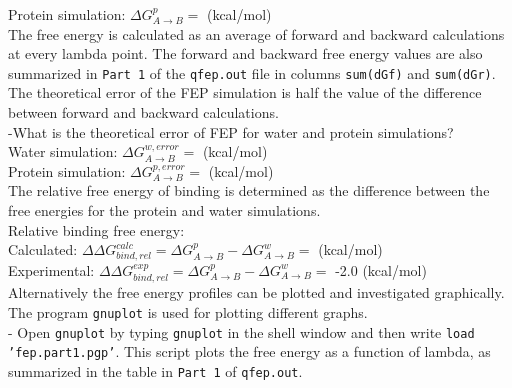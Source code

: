 \documentclass[10pt,oneside,pdftex]{article}
\begin{document}
Protein simulation: $\Delta G_{A \rightarrow B}^p=$ \hspace{2cm}(kcal/mol)\\

The free  energy is calculated as  an average of forward  and backward
calculations  at every  lambda point.  The forward  and backward  free
energy  values  are also  summarized  in  \texttt{Part   1}  of  the
\texttt{qfep.out}    file    in    columns    \texttt{sum(dGf)}    and
\texttt{sum(dGr)}. The theoretical error of the FEP simulation is half
the   value   of  the   difference   between   forward  and   backward
calculations.\\

-What is the theoretical error of FEP for water and protein simulations?\\

Water simulation: $\Delta G_{A \rightarrow B}^{w,error}=$ \hspace{2cm} (kcal/mol)\\

Protein simulation: $\Delta G_{A \rightarrow B}^{p,error}=$ \hspace{2cm}(kcal/mol)\\

The relative free energy of binding is determined as the difference between the
free energies for the protein and water simulations.\\

Relative binding free energy:\\

Calculated: $\Delta \Delta G_{bind,rel}^{calc} = \Delta G_{A \rightarrow B}^p-\Delta G_{A \rightarrow B}^w=$\hspace{1cm} (kcal/mol)\\

Experimental: $\Delta \Delta G_{bind,rel}^{exp} = \Delta G_{A \rightarrow B}^p-\Delta G_{A \rightarrow B}^w=$ -2.0 (kcal/mol)\\

Alternatively the free energy profiles can be plotted and investigated
graphically. The program \texttt{gnuplot} is used for plotting different graphs.\\

- Open \texttt{gnuplot} by typing \texttt{gnuplot} in the shell
window and then write \texttt{load 'fep.part1.pgp'}. This script
plots the free energy as a function of lambda, as summarized in
the table in \texttt{Part 1} of \texttt{qfep.out}.\\
\end{document}
